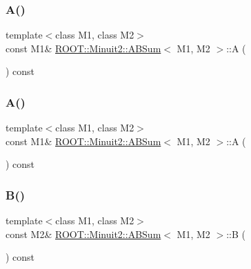 \subsubsection{\texorpdfstring{A()}{A()}\hspace{0.1cm}{\footnotesize\ttfamily [1/2]}}
{\footnotesize\ttfamily template$<$class M1, class M2$>$ \\
const M1\& \mbox{\hyperlink{classROOT_1_1Minuit2_1_1ABSum}{R\+O\+O\+T\+::\+Minuit2\+::\+A\+B\+Sum}}$<$ M1, M2 $>$\+::A (\begin{DoxyParamCaption}{ }\end{DoxyParamCaption}) const\hspace{0.3cm}{\ttfamily [inline]}}

\mbox{\label{classROOT_1_1Minuit2_1_1ABSum_a079b47b55709bd81d820c277aa389b4f}} 
\subsubsection{\texorpdfstring{A()}{A()}\hspace{0.1cm}{\footnotesize\ttfamily [2/2]}}
{\footnotesize\ttfamily template$<$class M1, class M2$>$ \\
const M1\& \mbox{\hyperlink{classROOT_1_1Minuit2_1_1ABSum}{R\+O\+O\+T\+::\+Minuit2\+::\+A\+B\+Sum}}$<$ M1, M2 $>$\+::A (\begin{DoxyParamCaption}{ }\end{DoxyParamCaption}) const\hspace{0.3cm}{\ttfamily [inline]}}

\mbox{\label{classROOT_1_1Minuit2_1_1ABSum_a6370bd6e7593778d1933ef761dad2449}} 
\subsubsection{\texorpdfstring{B()}{B()}\hspace{0.1cm}{\footnotesize\ttfamily [1/2]}}
{\footnotesize\ttfamily template$<$class M1, class M2$>$ \\
const M2\& \mbox{\hyperlink{classROOT_1_1Minuit2_1_1ABSum}{R\+O\+O\+T\+::\+Minuit2\+::\+A\+B\+Sum}}$<$ M1, M2 $>$\+::B (\begin{DoxyParamCaption}{ }\end{DoxyParamCaption}) const\hspace{0.3cm}{\ttfamily [inline]}}

